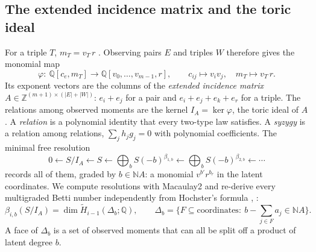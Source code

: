 \documentclass[11pt]{article}
\theoremstyle{definition}\newtheorem{definition}[theorem]{Definition}\newtheorem{remark}[theorem]{Remark}\newtheorem{example}[theorem]{Example}
\begin{document}
\subsection{The extended incidence matrix and the toric ideal}
For a triple $T$, $m_T=v_T\,r$ \cite[Lemma ``moments'']{Lab}. Observing pairs $E$ and triples $W$ therefore gives the monomial map
\[
\varphi:\ \mathbb Q[c_e,m_T]\to\mathbb Q[v_0,\dots,v_{m-1},r],\qquad c_{ij}\mapsto v_iv_j,\quad m_T\mapsto v_T\,r .
\]
Its exponent vectors are the columns of the \emph{extended incidence matrix} $A\in\mathbb Z^{(m+1)\times(|E|+|W|)}$: $e_i+e_j$ for a pair
and $e_i+e_j+e_k+e_r$ for a triple. The relations among observed moments are the kernel $I_A=\ker\varphi$, the toric ideal of $A$
\cite{Sturmfels1996}. A \emph{relation} is a polynomial identity that every two-type law satisfies. A \emph{syzygy} is a relation among
relations, $\sum_jh_jg_j=0$ with polynomial coefficients. The minimal free resolution
\[
0\leftarrow S/I_A\leftarrow S\leftarrow\bigoplus_bS(-b)^{\beta_{1,b}}\leftarrow\bigoplus_bS(-b)^{\beta_{2,b}}\leftarrow\cdots
\]
records all of them, graded by $b\in\mathbb NA$: a monomial $v^{b'}r^{b_r}$ in the latent coordinates. We compute resolutions with
Macaulay2 \cite{M2} and re-derive every multigraded Betti number independently from Hochster's formula \cite{Hochster1972},
\cite[Theorem 9.2]{MillerSturmfels2005}:
\[
\beta_{i,b}(S/I_A)=\dim\tilde H_{i-1}(\Delta_b;\mathbb Q),\qquad \Delta_b=\{F\subseteq\text{coordinates}:\ b-\textstyle\sum_{j\in F}a_j\in\mathbb NA\}.
\]
A face of $\Delta_b$ is a set of observed moments that can all be split off a product of latent degree $b$.
\end{document}
